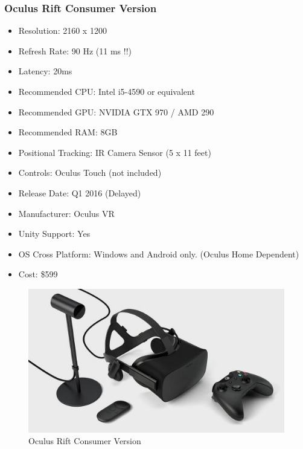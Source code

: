 \documentclass[a4paper,10pt]{article}
\begin{document}
\subsubsection{Oculus Rift Consumer Version}
\begin{itemize}
	\item Resolution: 2160 x 1200
	\item Refresh Rate: 90 Hz (11 ms !!)
	\item Latency: 20ms
	\item Recommended CPU: Intel i5-4590 or equivalent
	\item Recommended GPU: NVIDIA GTX 970 / AMD 290 
	\item Recommended RAM: 8GB
	\item Positional Tracking: IR Camera Sensor (5 x 11 feet)
	\item Controls: Oculus Touch (not included)
	\item Release Date: Q1 2016 (Delayed)
	\item Manufacturer: Oculus VR
	\item Unity Support: Yes
	\item OS Cross Platform: Windows and Android only. (Oculus Home Dependent)
	\item Cost: \$599
\end{itemize}
\begin{figure}[H]
	\includegraphics[width=\linewidth,height=\paperheight,keepaspectratio]{cv.jpg}
	\caption{Oculus Rift Consumer Version}
	\label{fig:RiftCVImg}
	\end{figure}
	\pagebreak
\end{document}
